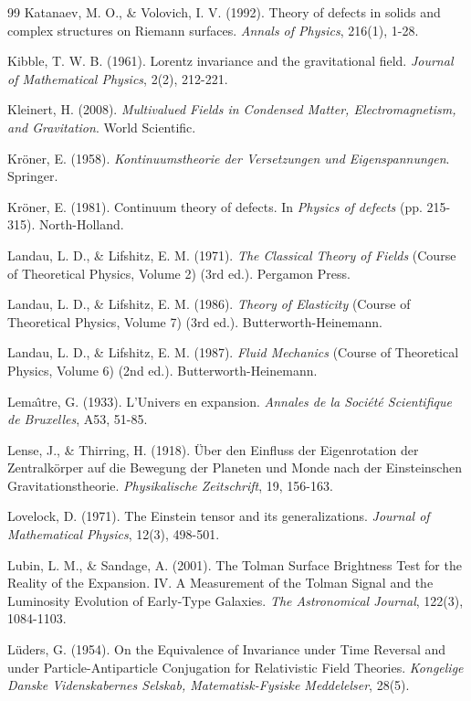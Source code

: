 \begin{thebibliography}{99}
Katanaev, M. O., \& Volovich, I. V. (1992). Theory of defects in solids and complex structures on Riemann surfaces. \textit{Annals of Physics}, 216(1), 1-28.

Kibble, T. W. B. (1961). Lorentz invariance and the gravitational field. \textit{Journal of Mathematical Physics}, 2(2), 212-221.

Kleinert, H. (2008). \textit{Multivalued Fields in Condensed Matter, Electromagnetism, and Gravitation}. World Scientific.

Kr\"{o}ner, E. (1958). \textit{Kontinuumstheorie der Versetzungen und Eigenspannungen}. Springer.

Kr\"{o}ner, E. (1981). Continuum theory of defects. In \textit{Physics of defects} (pp. 215-315). North-Holland.

Landau, L. D., \& Lifshitz, E. M. (1971). \textit{The Classical Theory of Fields} (Course of Theoretical Physics, Volume 2) (3rd ed.). Pergamon Press.

Landau, L. D., \& Lifshitz, E. M. (1986). \textit{Theory of Elasticity} (Course of Theoretical Physics, Volume 7) (3rd ed.). Butterworth-Heinemann.

Landau, L. D., \& Lifshitz, E. M. (1987). \textit{Fluid Mechanics} (Course of Theoretical Physics, Volume 6) (2nd ed.). Butterworth-Heinemann.

Lema\^{\i}tre, G. (1933). L'Univers en expansion. \textit{Annales de la Soci\'{e}t\'{e} Scientifique de Bruxelles}, A53, 51-85.

Lense, J., \& Thirring, H. (1918). \"{U}ber den Einfluss der Eigenrotation der Zentralk\"{o}rper auf die Bewegung der Planeten und Monde nach der Einsteinschen Gravitationstheorie. \textit{Physikalische Zeitschrift}, 19, 156-163.

Lovelock, D. (1971). The Einstein tensor and its generalizations. \textit{Journal of Mathematical Physics}, 12(3), 498-501.

Lubin, L. M., \& Sandage, A. (2001). The Tolman Surface Brightness Test for the Reality of the Expansion. IV. A Measurement of the Tolman Signal and the Luminosity Evolution of Early-Type Galaxies. \textit{The Astronomical Journal}, 122(3), 1084-1103.

L\"{u}ders, G. (1954). On the Equivalence of Invariance under Time Reversal and under Particle-Antiparticle Conjugation for Relativistic Field Theories. \textit{Kongelige Danske Videnskabernes Selskab, Matematisk-Fysiske Meddelelser}, 28(5).


\end{thebibliography}
